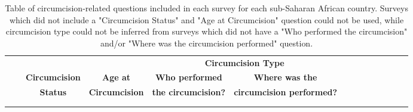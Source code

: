 \documentclass{article}
\begin{document}
\begin{appendix}
{\linespread{1}
\small
\begin{longtable}[c]{ll ccc ccc ccc ccc}
      \hline
      \multicolumn{1}{l}{} & &  &  & \multicolumn{2}{c}{\bf Circumcision Type} \\ 
      \cmidrule(lr){5-7}
       & & {\bf Circumcision} & {\bf Age at} & {\bf Who performed} & {\bf Where was the}  \\
       & & {\bf Status} & {\bf Circumcision} & {\bf the circumcision?} & {\bf circumcision performed?} \\[5pt]
      \hline
      \vspace{-5pt}
      \endhead
      \\[-5pt]\hline
      \caption{Table of circumcision-related questions included in each survey for each sub-Saharan African country. Surveys which did not include a "Circumcision Status" and "Age at Circumcision" question could not be used, while circumcision type could not be inferred from surveys which did not have a "Who performed the circumcision" and/or "Where was the circumcision performed" question.}
      \endfoot
      

\end{longtable}}
\end{appendix}
\end{document}
